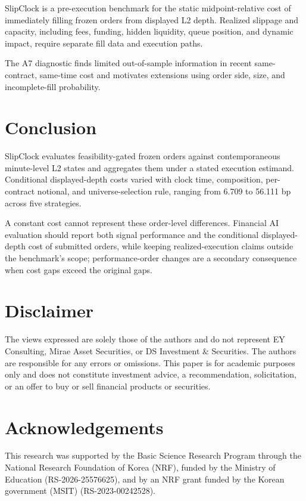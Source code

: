 \documentclass[sigconf]{acmart}
\begin{document}
SlipClock is a pre-execution benchmark for the static midpoint-relative cost of immediately filling frozen orders from displayed L2 depth. Realized slippage and capacity, including fees, funding, hidden liquidity, queue position, and dynamic impact, require separate fill data and execution paths.

The A7 diagnostic finds limited out-of-sample information in recent same-contract, same-time cost and motivates extensions using order side, size, and incomplete-fill probability.

\section{Conclusion}
SlipClock evaluates feasibility-gated frozen orders against contemporaneous minute-level L2 states and aggregates them under a stated execution estimand. Conditional displayed-depth costs varied with clock time, composition, per-contract notional, and universe-selection rule, ranging from 6.709 to 56.111 bp across five strategies.

A constant cost cannot represent these order-level differences. Financial AI evaluation should report both signal performance and the conditional displayed-depth cost of submitted orders, while keeping realized-execution claims outside the benchmark's scope; performance-order changes are a secondary consequence when cost gaps exceed the original gaps.

\FloatBarrier
\section*{Disclaimer}
The views expressed are solely those of the authors and do not represent EY Consulting, Mirae Asset Securities, or DS Investment \& Securities. The authors are responsible for any errors or omissions. This paper is for academic purposes only and does not constitute investment advice, a recommendation, solicitation, or an offer to buy or sell financial products or securities.

\section*{Acknowledgements}
This research was supported by the Basic Science Research Program through the National Research Foundation of Korea (NRF), funded by the Ministry of Education (RS-2026-25576625), and by an NRF grant funded by the Korean government (MSIT) (RS-2023-00242528).



\end{document}
